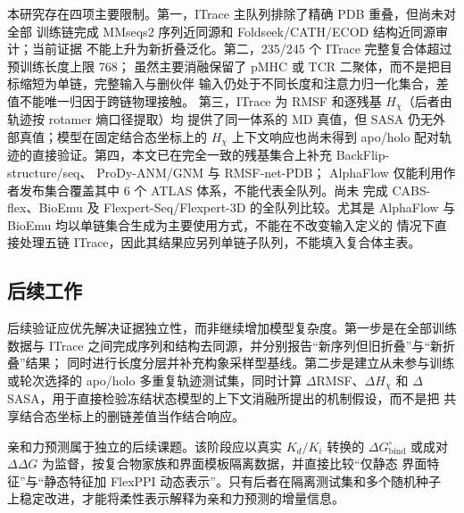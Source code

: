 本研究存在四项主要限制。第一，ITrace 主队列排除了精确 PDB 重叠，但尚未对全部
训练链完成 MMseqs2 序列近同源和 Foldseek/CATH/ECOD 结构近同源审计；当前证据
不能上升为新折叠泛化。第二，235/245 个 ITrace 完整复合体超过预训练长度上限 768；
虽然主要消融保留了 pMHC 或 TCR 二聚体，而不是把目标缩短为单链，完整输入与删伙伴
输入仍处于不同长度和注意力归一化集合，差值不能唯一归因于跨链物理接触。
第三，ITrace 为 RMSF 和逐残基 $H_\chi$（后者由轨迹按 rotamer 熵口径提取）均
提供了同一体系的 MD 真值，但 SASA 仍无外部真值；模型在固定结合态坐标上的
$H_\chi$ 上下文响应也尚未得到 apo/holo 配对轨迹的直接验证。第四，本文已在完全一致的残基集合上补充 BackFlip-structure/seq、
ProDy-ANM/GNM 与 RMSF-net-PDB；
AlphaFlow 仅能利用作者发布集合覆盖其中 6 个 ATLAS 体系，不能代表全队列。尚未
完成 CABS-flex、BioEmu 及 Flexpert-Seq/Flexpert-3D 的全队列比较。尤其是
AlphaFlow 与 BioEmu 均以单链集合生成为主要使用方式，不能在不改变输入定义的
情况下直接处理五链 ITrace，因此其结果应另列单链子队列，不能填入复合体主表。

\subsection{后续工作}

后续验证应优先解决证据独立性，而非继续增加模型复杂度。第一步是在全部训练数据与
ITrace 之间完成序列和结构去同源，并分别报告“新序列但旧折叠”与“新折叠”结果；
同时进行长度分层并补充构象采样型基线。第二步是建立从未参与训练或轮次选择的
apo/holo 多重复轨迹测试集，同时计算 $\Delta$RMSF、$\Delta H_\chi$ 和
$\Delta$SASA，用于直接检验冻结状态模型的上下文消融所提出的机制假设，而不是把
共享结合态坐标上的删链差值当作结合响应。

亲和力预测属于独立的后续课题。该阶段应以真实 $K_d/K_i$ 转换的
$\Delta G_{\mathrm{bind}}^{\circ}$ 或成对
$\Delta\Delta G$ 为监督，按复合物家族和界面模板隔离数据，并直接比较“仅静态
界面特征”与“静态特征加 FlexPPI 动态表示”。只有后者在隔离测试集和多个随机种子
上稳定改进，才能将柔性表示解释为亲和力预测的增量信息。
